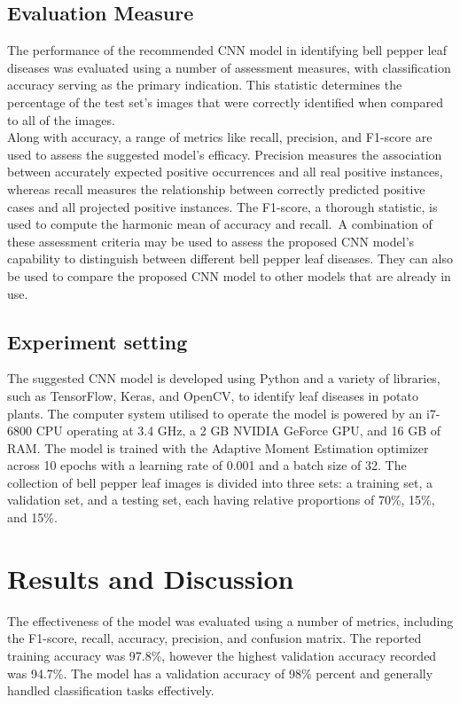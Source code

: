 \documentclass[conference]{IEEEtran}
\begin{document}
\subsection{Evaluation Measure}
The performance of the recommended CNN model in identifying bell pepper leaf diseases was evaluated using a number of assessment measures, with classification accuracy serving as the primary indication. This statistic determines the percentage of the test set's images that were correctly identified when compared to all of the images.\\ 


Along with accuracy, a range of metrics like recall, precision, and F1-score are used to assess the suggested model's efficacy. Precision measures the association between accurately expected positive occurrences and all real positive instances, whereas recall measures the relationship between correctly predicted positive cases and all projected positive instances. The F1-score, a thorough statistic, is used to compute the harmonic mean of accuracy and recall.\
A combination of these assessment criteria may be used to assess the proposed CNN model's capability to distinguish between different bell pepper leaf diseases. They can also be used to compare the proposed CNN model to other models that are already in use.


\subsection{Experiment setting} 
The suggested CNN model is developed using Python and a variety of libraries, such as TensorFlow, Keras, and OpenCV, to identify leaf diseases in potato plants. The computer system utilised to operate the model is powered by an i7-6800 CPU operating at 3.4 GHz, a 2 GB NVIDIA GeForce GPU, and 16 GB of RAM. The model is trained with the Adaptive Moment Estimation optimizer across 10 epochs with a learning rate of 0.001 and a batch size of 32. The collection of bell pepper leaf images is divided into three sets: a training set, a validation set, and a testing set, each having relative proportions of 70\%, 15\%, and 15\%.


\section{Results and Discussion}

The effectiveness of the model was evaluated using a number of metrics, including the F1-score, recall, accuracy, precision, and confusion matrix. The reported training accuracy was 97.8\%, however the highest validation accuracy recorded was 94.7\%. The model has a validation accuracy of 98\% percent and generally handled classification tasks effectively.
\end{document}
